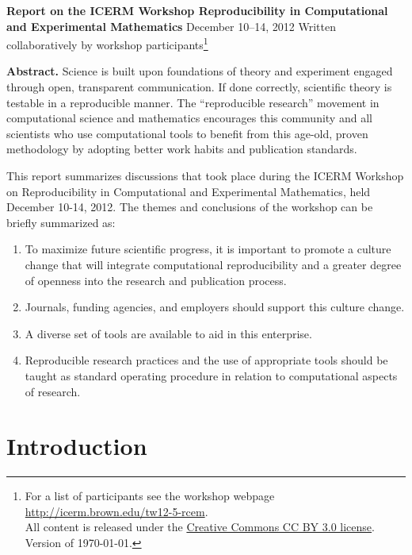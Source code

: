 \documentclass[11pt]{article}
\begin{document}
\begin{centering}
{\large\bf Report on the ICERM Workshop
\vskip 5pt
\Large
Reproducibility in 
\vskip 3pt
Computational and Experimental Mathematics}
\vskip 5pt
{\large December 10--14, 2012}
\vskip 10pt
Written collaboratively by workshop participants\footnote{%
For a list of participants see the workshop webpage
\url{http://icerm.brown.edu/tw12-5-rcem}.  \\
All content is released under the 
\href{http://creativecommons.org/licenses/by/3.0/}{Creative Commons CC BY
3.0 license}. \\
Version of \today.}
\vskip 5pt
\end{centering}
\vskip 10pt


{\bf Abstract.} 
Science is built upon foundations of theory and experiment engaged through
open, transparent communication. If 
done correctly, scientific theory is testable in a reproducible manner.
The ``reproducible research'' movement in computational science and
mathematics encourages this community and all scientists who use
computational tools to benefit from 
this age-old, proven methodology by adopting better work habits and
publication standards.  

This report summarizes discussions that took place during the 
ICERM Workshop on Reproducibility in Computational and Experimental
Mathematics, held December 10-14, 2012.
The themes and conclusions of the workshop can be briefly summarized as:
\begin{enumerate} 

\item To maximize future scientific progress, 
it is important to promote a culture change that will integrate 
computational reproducibility and a greater degree of openness
into the research and publication process.

\item Journals, funding agencies, and employers 
should support this culture change.

\item A diverse set of tools are available to aid in this enterprise.

\item Reproducible research practices and the use of appropriate tools
should be taught as standard operating procedure in relation to
computational aspects of research.
\end{enumerate}

\vskip 10pt

\section{Introduction} \label{sec:intro}
\end{document}

